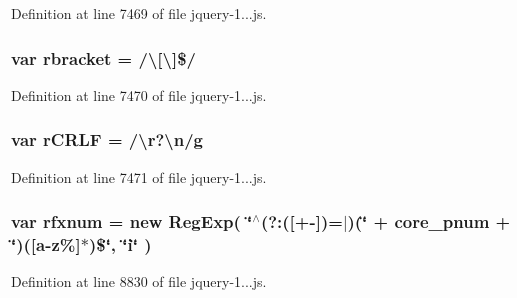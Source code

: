 Definition at line 7469 of file jquery-\/1...\+js.

\hypertarget{_scripts_2jquery-1_810_82_8js_a07117e28ee58d2d2664cfbaf741e10c1}{}
\subsubsection[{rbracket}]{\setlength{\rightskip}{0pt plus 5cm}var rbracket = /\textbackslash{}\mbox{[}\textbackslash{}\mbox{]}\$/}\label{_scripts_2jquery-1_810_82_8js_a07117e28ee58d2d2664cfbaf741e10c1}


Definition at line 7470 of file jquery-\/1...\+js.

\hypertarget{_scripts_2jquery-1_810_82_8js_a4fd9dfc4eb645b441a3e84730c50154b}{}
\subsubsection[{r\+C\+R\+L\+F}]{\setlength{\rightskip}{0pt plus 5cm}var r\+C\+R\+L\+F = /\textbackslash{}r?\textbackslash{}n/{\bf g}}\label{_scripts_2jquery-1_810_82_8js_a4fd9dfc4eb645b441a3e84730c50154b}


Definition at line 7471 of file jquery-\/1...\+js.

\hypertarget{_scripts_2jquery-1_810_82_8js_a7907e208847275b29993c85031275f9f}{}
\subsubsection[{rfxnum}]{\setlength{\rightskip}{0pt plus 5cm}var rfxnum = new Reg\+Exp( \char`\"{}$^\wedge$(?\+:(\mbox{[}+-\/\mbox{]})=$\vert$)(\char`\"{} + core\+\_\+pnum + \char`\"{})(\mbox{[}a-\/z\%\mbox{]}$\ast$)\$\char`\"{}, \char`\"{}{\bf i}\char`\"{} )}\label{_scripts_2jquery-1_810_82_8js_a7907e208847275b29993c85031275f9f}


Definition at line 8830 of file jquery-\/1...\+js.

\hypertarget{_scripts_2jquery-1_810_82_8js_a28b1e14ecaade6675453a292b2c1dba6}{}

